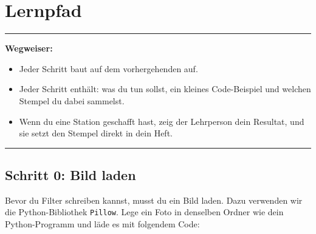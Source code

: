 \renewcommand{\chaptertag}{Bildfilter}
\chapter{Lernpfad}

\newcommand{\stempel}[2]{%
  \par\vspace{3pt}\noindent
  \begin{tikzpicture}[baseline=-0.3em]
    \node[fill=cinnabar, rounded corners=2pt,
          inner xsep=5pt, inner ysep=2pt,
          font=\scriptsize\bfseries\color{white}] {Stempel #1};
  \end{tikzpicture}\,%
  \textit{\color{cinnabar}#2}\par\vspace{2pt}%
}

\vspace{-5pt}
{\color{maincolor}\rule{\textwidth}{0.4pt}}
\vspace{4pt}

{\color{maincolor}\textbf{Wegweiser:}}
\begin{itemize}[leftmargin=*]
  \item Jeder Schritt baut auf dem vorhergehenden auf.
  \item Jeder Schritt enth\"alt: was du tun sollst, ein kleines Code-Beispiel
    und welchen Stempel du dabei sammelst.
  \item Wenn du eine Station geschafft hast, zeig der Lehrperson dein
    Resultat, und sie setzt den Stempel direkt in dein Heft.
\end{itemize}
\vspace{-2pt}
{\color{maincolor}\rule{\textwidth}{0.4pt}}
\vspace{8pt}

\section{Schritt 0: Bild laden}

Bevor du Filter schreiben kannst, musst du ein Bild laden. Dazu
verwenden wir die Python-Bibliothek \texttt{Pillow}. Lege ein Foto in
denselben Ordner wie dein Python-Programm und l\"ade es mit folgendem
Code:

